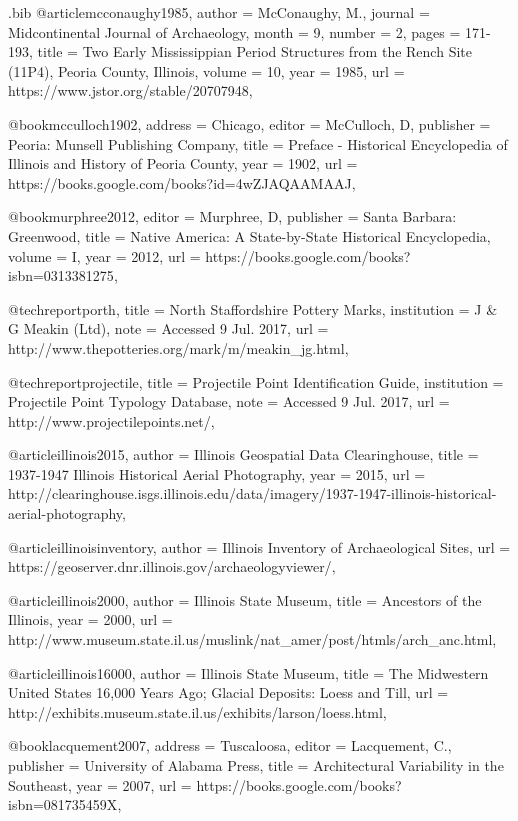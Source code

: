 \begin{filecontents}{\IJSRAidentifier.bib}
	@article{mcconaughy1985,
		author = {McConaughy, M.},
		journal = {Midcontinental Journal of Archaeology},
		month = {9},
		number = {2},
		pages = {171-193},
		title = {Two Early Mississippian Period Structures from the Rench Site (11P4), Peoria County, Illinois},
		volume = {10},
		year = {1985},
		url = {https://www.jstor.org/stable/20707948},
	}

	@book{mcculloch1902,
		address = {Chicago},
		editor = {McCulloch, D},
		publisher = {Peoria: Munsell Publishing Company},
		title = {Preface - Historical Encyclopedia of Illinois and History of Peoria County},
		year = {1902},
		url = {https://books.google.com/books?id=4wZJAQAAMAAJ},
	}

	@book{murphree2012,
		editor = {Murphree, D},
		publisher = {Santa Barbara: Greenwood},
		title = {Native America: A State-by-State Historical Encyclopedia},
		volume = {I},
		year = {2012},
		url = {https://books.google.com/books?isbn=0313381275},
	}

	@techreport{porth,
		title = {North Staffordshire Pottery Marks},
		institution = {J \& G Meakin (Ltd)},
		note = {Accessed 9 Jul. 2017},
		url = {http://www.thepotteries.org/mark/m/meakin_jg.html},
	}

	@techreport{projectile,
		title = {Projectile Point Identification Guide},
		institution = {Projectile Point Typology Database},
		note = {Accessed 9 Jul. 2017},
		url = {http://www.projectilepoints.net/},
	}


	@article{illinois2015,
		author = {Illinois Geospatial Data Clearinghouse},
		title = {1937-1947 Illinois Historical Aerial Photography},
		year = {2015},
		url = {http://clearinghouse.isgs.illinois.edu/data/imagery/1937-1947-illinois-historical-aerial-photography},
	}

	@article{illinoisinventory,
		author = {Illinois Inventory of Archaeological Sites},
		url = {https://geoserver.dnr.illinois.gov/archaeologyviewer/},
	}

	@article{illinois2000,
		author = {Illinois State Museum},
		title = {Ancestors of the Illinois},
		year = {2000},
		url = {http://www.museum.state.il.us/muslink/nat\_amer/post/htmls/arch\_anc.html},
	}

	@article{illinois16000,
		author = {Illinois State Museum},
		title = {The Midwestern United States 16,000 Years Ago; Glacial Deposits: Loess and Till},
		url = {http://exhibits.museum.state.il.us/exhibits/larson/loess.html},
	}

	@book{lacquement2007,
		address = {Tuscaloosa},
		editor = {Lacquement, C.},
		publisher = {University of Alabama Press},
		title = {Architectural Variability in the Southeast},
		year = {2007},
		url = {https://books.google.com/books?isbn=081735459X},
	}



\end{filecontents}
